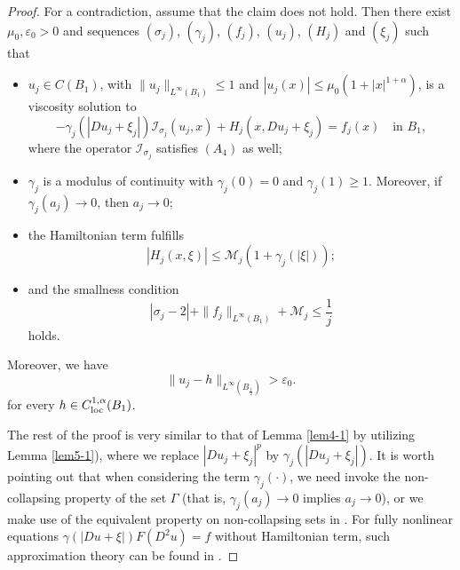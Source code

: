 \documentclass[11pt,reqno]{amsart}
\numberwithin{equation}{section}
\begin{document}
\begin{proof}
For a contradiction, assume that the claim does not hold. Then there exist $\mu_0,\varepsilon_0>0$ and sequences $(\sigma_j)$, $(\gamma_j)$, $(f_j)$, $(u_j)$, $(H_j)$ and  $(\xi_j)$ such that
\begin{itemize}
  \item[(i)]
  $u_j\in C(B_1)$, with $\|u_j\|_{L^\infty(B_1)}\leq 1$ and $|u_j(x)|\le\mu_0(1+|x|^{1+\alpha})$, is a viscosity solution to
      \begin{equation*}
      -\gamma_j(|Du_j+\xi_j|)\mathcal{I}_{\sigma_j}(u_j,x)+H_j(x,Du_j+\xi_j)=f_j(x)  \quad \text{in } B_1,
      \end{equation*}
      where the operator $\mathcal{I}_{\sigma_j}$ satisfies $(A_4)$ as well;

    \smallskip

  \item[(ii)] $\gamma_j$ is a modulus of continuity with $\gamma_j(0)=0$ and $\gamma_j(1)\ge1$. Moreover, if $\gamma_j(a_j)\rightarrow0$, then $a_j\rightarrow0$;

  \item[(iii)] the Hamiltonian term fulfills
  \begin{equation*}%
  |H_j(x,\xi)|\le \mathcal{M}_j(1+\gamma_j(|\xi|));
  \end{equation*}

    \smallskip

  \item[(iv)] and the smallness condition
  \begin{equation*}
|\sigma_j-2|+\|f_j\|_{L^\infty(B_1)}+\mathcal{M}_j\leq \frac{1}{j}
\end{equation*}
holds.
\end{itemize}
Moreover, we have
$$
\|u_j-h\|_{L^\infty(B_{\frac12})}>\varepsilon_0.
$$
for every $h\in C^{1,\alpha}_{\rm loc}(B_1)$.

The rest of the proof is very similar to that of Lemma \ref{lem4-1} by utilizing Lemma \ref{lem5-1}), where we replace $|Du_j+\xi_j|^p$ by $\gamma_j(|Du_j+\xi_j|)$. It is worth pointing out that when considering the term $\gamma_j(\cdot)$, we need invoke the non-collapsing property of the set $\Gamma$ (that is, $\gamma_j(a_j)\rightarrow0$ implies $a_j\rightarrow0$), or we make use of the equivalent property on non-collapsing sets in \cite[Proposition 2 (2)]{APPT22}. For fully nonlinear equations $\gamma(|Du+\xi|)F(D^2u)=f$ without Hamiltonian term, such approximation theory can be found in \cite[Proposition 6]{APPT22}.
\end{proof}
\end{document}
